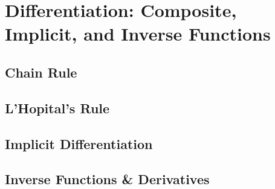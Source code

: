 \documentclass[../abcalc.tex]{subfiles}
\begin{document}
\chapter{Differentiation: Composite, Implicit, and Inverse Functions}
\section{Chain Rule}
\section{L'Hopital's Rule}
\section{Implicit Differentiation}
\section{Inverse Functions \& Derivatives}
\end{document}
